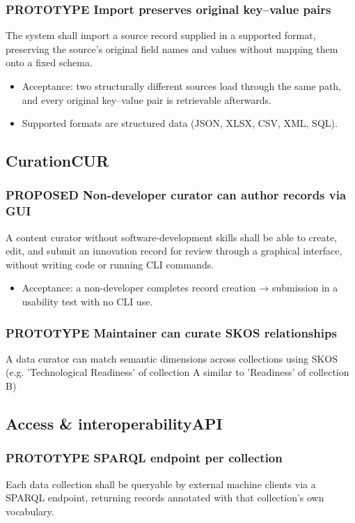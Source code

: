 \documentclass{scrartcl}
\begin{document}
\subsubsection{{\bfseries\sffamily PROTOTYPE} Import preserves original key–value pairs}
\label{sec:orga782bd5}
The system shall import a source record supplied in a supported format, preserving the source's original field names and values without mapping them onto a fixed schema.
\begin{itemize}
\item Acceptance: two structurally different sources load through the same path, and every original key–value pair is retrievable afterwards.
\item Supported formats are structured data (JSON, XLSX, CSV, XML, SQL).
\end{itemize}
\subsection{Curation\hfill{}\textsc{CUR}}
\label{sec:org2d69db7}
\subsubsection{{\bfseries\sffamily PROPOSED} Non-developer curator can author records via GUI}
\label{sec:org548d9ad}
A content curator without software-development skills shall be able to create, edit, and submit an innovation record for review through a graphical interface, without writing code or running CLI commands.
\begin{itemize}
\item Acceptance: a non-developer completes record creation → submission in a usability test with no CLI use.
\end{itemize}
\subsubsection{{\bfseries\sffamily PROTOTYPE} Maintainer can curate SKOS relationships}
\label{sec:org10ef29b}
A data curator can match semantic dimensions across collections using SKOS (e.g. 'Technological Readiness' of collection A similar to 'Readiness' of collection B)
\subsection{Access \& interoperability\hfill{}\textsc{API}}
\label{sec:orgf8de93e}
\subsubsection{{\bfseries\sffamily PROTOTYPE} SPARQL endpoint per collection}
\label{sec:orgfb95533}
Each data collection shall be queryable by external machine clients via a SPARQL endpoint, returning records annotated with that collection's own vocabulary.
\end{document}
